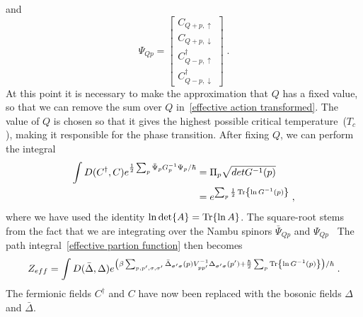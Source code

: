 \documentclass{article}
\begin{document}
and
\begin{equation}
   \Psi_{Q p} = 
\begin{bmatrix}
     C_{Q + p,\uparrow} \\
     C_{Q + p,\downarrow}  \\
     C^{\dagger}_{Q - p,\uparrow}  \\
     C^{\dagger}_{Q - p,\downarrow}
\end{bmatrix}\;.
\end{equation} 
At this point it is necessary to make the approximation that $Q$ has a fixed value, so that we can remove the sum over $Q$ in~\cref{effective action transformed}. The value of $Q$ is chosen so that it gives the highest possible critical temperature~($T_c$), making it responsible for the phase transition. After fixing $Q$, we can perform the integral  
\begin{align}
    \int D(C^{\dagger},C) e^{\frac{1}{2} \sum_{p} \bar{\Psi}_{p} G^{-1}_ {p} \Psi_{p} / \hbar} &= \Pi_p \sqrt{det{G^{-1}(p)}} \nonumber\\
                                                                                               &= e^{\sum_p \frac{1}{2}\Tr{\ln{G^{-1}(p)}}} \;\nonumber,
\end{align}
where we have used the identity $\ln{\det{A}} = \Tr{\ln{A}}$. The square-root stems from the fact that we are integrating over the Nambu spinors $\bar{\Psi}_{Q p}$ and $\Psi_{Q p}$~\cite{Wegner2016,Hugdal2019}  The path integral~\cref{effective partion function} then becomes
\begin{equation}
    Z_{eff} = \int D(\bar{\Delta}, \Delta) e^{\left(\beta\sum_{p,p',\sigma,\sigma'} \bar{\Delta}_{\sigma' \sigma}(p) V^{-1}_{p p'} \Delta_{\sigma' \sigma}(p') + \frac{\hbar}{2} \sum_p \Tr{\ln{G^{-1}(p)}}\right) / \hbar}\;. 
\end{equation}
The fermionic fields $C^{\dagger}$ and $C$ have now been replaced with the bosonic fields $\Delta$ and $\bar{\Delta}$.
\end{document}
